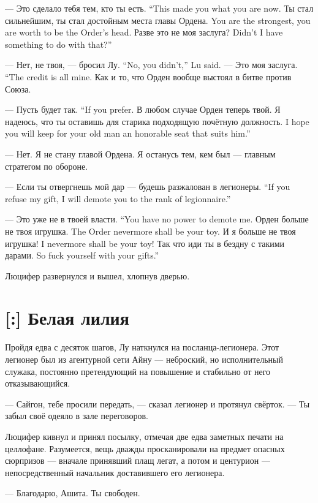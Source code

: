 {--- Это сделало тебя тем, кто ты есть.}
{``This made you what you are now.}
{Ты стал сильнейшим, ты стал достойным места главы Ордена.}
{You are the strongest, you are worth to be the Order's head.}
{Разве это не моя заслуга?}
{Didn't I have something to do with that?''}

{--- Нет, не твоя, --- бросил Лу.}
{``No, you didn't,'' Lu said.}
{--- Это моя заслуга.}
{``The credit is all mine.}
Как и то, что Орден вообще выстоял в битве против Союза.

{--- Пусть будет так.}
{``If you prefer.}
В любом случае Орден теперь твой.
{Я надеюсь, что ты оставишь для старика подходящую почётную должность.}
{I hope you will keep for your old man an honorable seat that suits him.''}

--- Нет.
Я не стану главой Ордена.
Я останусь тем, кем был --- главным стратегом по обороне.

{--- Если ты отвергнешь мой дар --- будешь разжалован в легионеры.}
{``If you refuse my gift, I will demote you to the rank of legionnaire.''}

{--- Это уже не в твоей власти.}
{``You have no power to demote me.}
{Орден больше не твоя игрушка.}
{The Order nevermore shall be your toy.}
{И я больше не твоя игрушка!}
{I nevermore shall be your toy!}
{Так что иди ты в бездну с такими дарами.}
{So fuck yourself with your gifts.''}

Люцифер развернулся и вышел, хлопнув дверью.

\section{[:] Белая лилия}

Пройдя едва с десяток шагов, Лу наткнулся на посланца-легионера.
Этот легионер был из агентурной сети Айну --- неброский, но исполнительный служака, постоянно претендующий на повышение и стабильно от него отказывающийся.

--- Сайгон, тебе просили передать, --- сказал легионер и протянул свёрток.
--- Ты забыл своё одеяло в зале переговоров.

Люцифер кивнул и принял посылку, отмечая две едва заметных печати на целлофане.
Разумеется, вещь дважды просканировали на предмет опасных сюрпризов --- вначале принявший плащ легат, а потом и центурион --- непосредственный начальник доставившего его легионера.

--- Благодарю, Ашита.
Ты свободен.

